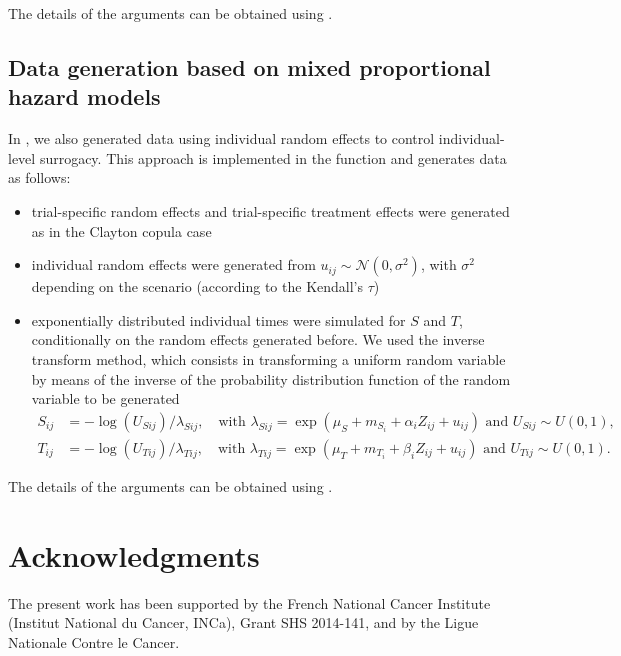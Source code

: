 \documentclass[article,shortnames, nojss]{jss}\usepackage[]{graphicx}\usepackage[]{color}
\begin{document}
The details of the arguments can be obtained using .

\subsection{Data generation based on mixed proportional hazard models}
In \cite{RotoloPoissurogate}, we also generated data using
  individual random effects to control individual-level surrogacy.
  This approach is implemented in the function 
  and generates data as follows:
  \begin{itemize}
    \item trial-specific random effects and 
      trial-specific treatment effects were generated 
      as in the Clayton copula case
    \item individual random effects were generated from
      $u_{ij} \sim \mathcal N(0, \sigma^2)$,
      with $\sigma^2$ depending on the scenario
      (according to the Kendall's $\tau$)
    \item exponentially distributed individual times were simulated
      for $S$ and $T$, conditionally on the random effects generated before.
      We used the inverse transform method, 
      which consists in transforming a uniform random variable
      by means of the inverse of the probability distribution function
      of the random variable to be generated
      \cite[see for instance][\S~2.1.2]{RobertCasella10}
      \begin{align*}
        S_{ij} &= -\log(U_{Sij}) / \lambda_{Sij},
        \quad \text{with } 
        \lambda_{Sij} = \exp(\mu_S + m_{S_i} + \alpha_i Z_{ij} + u_{ij})
        \text{ and } U_{Sij} \sim U(0,1),
        \\
        T_{ij} &= -\log(U_{Tij}) / \lambda_{Tij},
        \quad \text{with }
        \lambda_{Tij} = \exp(\mu_T + m_{T_i} + \beta_i  Z_{ij} + u_{ij})
        \text{ and } U_{Tij} \sim U(0,1). 
      \end{align*}
  \end{itemize}
The details of the arguments can be obtained using .


\section*{Acknowledgments}
The present work has been supported
  by the French National Cancer Institute (Institut National du Cancer, INCa),
  Grant SHS 2014-141, and by the Ligue Nationale Contre le Cancer.
\end{document}
